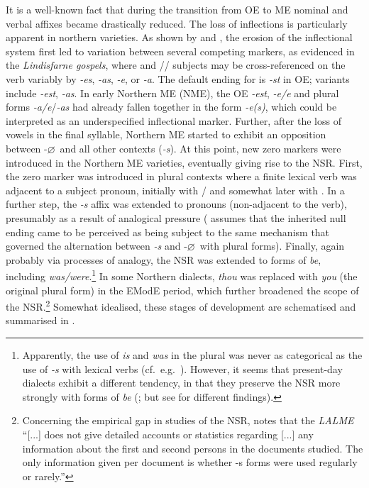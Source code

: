 \documentclass[output=paper]{langsci/langscibook}
\begin{document}
It is a well-known fact that during the transition from \gls{OE} to \gls{ME}
nominal and verbal affixes became drastically reduced. The loss of inflections
is particularly apparent in northern varieties. As shown by \cite{Berndt1956}
and \cite{Cole2014}, the erosion of the inflectional system first led to
variation between several competing  markers, as evidenced in the
\emph{Lindisfarne gospels}, where \Tsg{} and \Fpl{}/\Spl{}/\Tpl{} subjects may
be cross-referenced on the verb variably by \emph{-es}, \emph{-as},
\mbox{\emph{-e\dh}}, or \emph{-a\dh}. The default ending for \Ssg{} is \emph{-st} in
\gls{OE}; variants include \emph{-est}, \emph{-as}. In early Northern ME
(\gls{NME}), the \gls{OE} \Ssg{}  \emph{-est}, \Tsg{} \emph{-e/{\dh}e} and plural
forms \emph{-a/{\dh}e}/\emph{-as} had already fallen together in the form
\emph{-e(s)}, which could be interpreted as an underspecified inflectional
marker. Further, after the loss of vowels in the final syllable, Northern ME
started to exhibit an opposition between \Fsg{} -$\varnothing$\ and all other contexts
(\emph{-s}). At this point, new zero markers were introduced in the Northern ME
varieties, eventually giving rise to the \gls{NSR}. First, the zero marker was
introduced in plural contexts where a finite lexical verb was adjacent to a
subject pronoun, initially with \Fpl/\Spl{} and somewhat later with \Tpl{}. In
a further step, the \emph{-s} affix was extended to \Fsg{} pronouns
(non-adjacent to the verb), presumably as a result of analogical pressure
(\citealt{Holmqvist:1922} assumes that the inherited null \Fsg{} ending came to
be perceived as being subject to the same mechanism that governed the
alternation between \emph{-s} and -$\varnothing$\ with plural forms).  Finally, again
probably via processes of analogy, the \gls{NSR} was extended to forms of
\emph{be}, including \emph{was/were}.\footnote{Apparently, the use of \emph{is}
    and \emph{was} in the plural was never as categorical as the use of
    \emph{-s} with lexical verbs (cf.\ e.g.\ \citealt{Montgomery:1994}). However, it
    seems that present-day dialects exhibit a different tendency, in that they
    preserve the \gls{NSR} more strongly with forms of \emph{be}
    (\citealt[12--13]{Pietsch:2005b}; but see \citealt{Buchstaller_etal:2013} for
different findings).} In some Northern dialects, \Ssg{} \emph{thou} was
replaced with \emph{you} (the original plural form) in the \gls{EModE} period,
which further broadened the scope of the \gls{NSR}.\footnote{Concerning the
    empirical gap in studies of the \gls{NSR}, \textcite[46]{Pietsch:2005b}
    notes that the \emph{LALME} \parencite{McIntosh2013} ``[...] does not give
    detailed accounts or statistics regarding [...] any information about the
    first and second persons in the documents studied. The only information
    given per document is whether -s forms were used regularly or rarely.''}
    Somewhat idealised, these stages of development are schematised and
    summarised in .
\end{document}

